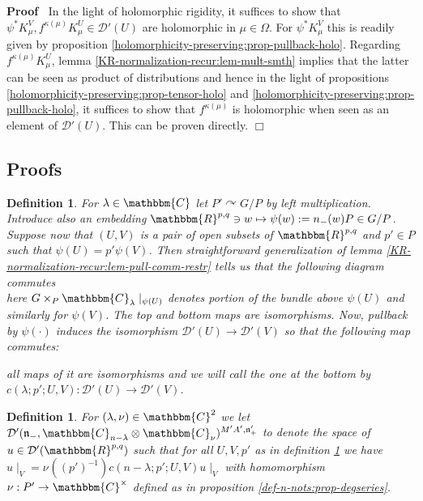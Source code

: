 \documentclass[12pt]{article}
\newcommand{\assign}{:=}
\renewenvironment{proof}{\noindent\textbf{Proof\ }}{\hspace*{\fill}$\Box$\medskip}
\newtheorem{definition}[proposition]{Definition}
\theoremstyle{remark}
\begin{document}
\begin{proof}
  In the light of holomorphic rigidity, it suffices to show that $\psi^{\ast}
  K^V_{\mu}, f^{\kappa (\mu)} K^U_{\mu} \in \mathcal{D}' (U)$ are holomorphic
  in $\mu \in \Omega$. For $\psi^{\ast} K_{\mu}^V$ this is readily given by
  proposition \ref{holomorphicity-preserving:prop-pullback-holo}. Regarding
  $f^{\kappa (\mu)} K^U_{\mu}$, lemma
  \ref{KR-normalization-recur:lem-mult-smth} implies that the latter can be
  seen as product of distributions and hence in the light of propositions
  \ref{holomorphicity-preserving:prop-tensor-holo} and
  \ref{holomorphicity-preserving:prop-pullback-holo}, it suffices to show that
  $f^{\kappa (\mu)}$ is holomorphic when seen as an element of $\mathcal{D}'
  (U)$. This can be proven directly.
\end{proof}

\subsection{Proofs}

\begin{definition}
  \label{sol:def-localaciton}For $\lambda \in \mathbbm{C}$ let $P'
  \curvearrowright G / P$ by left multiplication. Introduce also an embedding
  $\mathbbm{R}^{p, q} \ni w \mapsto \psi (w) \assign n_- (w) P \in G / P$.
  Suppose now that $(U, V)$ is a pair of open subsets of $\mathbbm{R}^{p, q}$
  and $p' \in P$ such that $\psi (U) = p' \psi (V)$. Then straightforward
  generalization of lemma \ref{KR-normalization-recur:lem-pull-comm-restr}
  tells us that the following diagram commutes\\
  here $G \times_P \mathbbm{C}_{\lambda} \mid_{\psi (U)}$ denotes portion
  of the bundle above $\psi (U)$ and similarly for $\psi (V)$. The top and
  bottom maps are isomorphisms. Now, pullback by $\psi (\cdot)$ induces the
  isomorphism $\mathcal{D}' (U) \rightarrow \mathcal{D}' (V)$ so that the
  following map commutes:\\
  
  all maps of it are isomorphisms and we will call the one at the bottom by $c
  (\lambda ; p' ; U, V) : \mathcal{D}' (U) \rightarrow \mathcal{D}' (V)$.
\end{definition}

\begin{definition}
  \label{sol:def-D'n}For $(\lambda, \nu) \in \mathbbm{C}^2$ we let
  $\mathcal{D}' (\mathfrak{n}_-, \mathbbm{C}_{n - \lambda} \otimes
  \mathbbm{C}_{\nu})^{M' A', \mathfrak{n}'_+}$ to denote the space of $u \in
  \mathcal{D}' (\mathbbm{R}^{p, q})$ such that for all $U, V, p'$ as in
  definition \ref{sol:def-localaciton} we have $u \mid_V = \nu^{} ((p')^{-
  1}) c (n - \lambda ; p' ; U, V) u \mid_V$ with homomorphism $\nu : P'
  \rightarrow \mathbbm{C}^{\times}$ defined as in proposition
  \ref{def-n-nots:prop-degseries}.
\end{definition}
\end{document}
